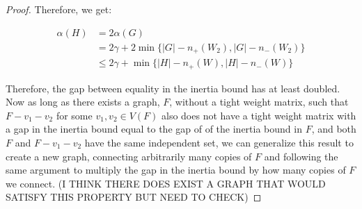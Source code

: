 \documentclass[12pt]{article}
\theoremstyle{parenbold}
\begin{document}
\begin{proof}
Therefore, we get:

\begin{equation}
\begin{split}
\alpha(H) & = 2\alpha(G) \\ & = 2\gamma + 2\min\{|G|-n_+(W_2), |G|-n_-(W_2)\} \\ & \leq 2\gamma + \min\{|H|-n_+(W), |H|-n_-(W)\}
\end{split}
\end{equation}

Therefore, the gap between equality in the inertia bound has at least doubled. Now as long as there exists a graph, $F$, without a tight weight matrix, such that $F-v_1-v_2$ for some $v_1, v_2 \in V(F)$ also does not have a tight weight matrix with a gap in the inertia bound equal to the gap of of the inertia bound in $F$, and both $F$ and $F-v_1-v_2$ have the same independent set, we can generalize this result to create a new graph, connecting arbitrarily many copies of $F$ and following the same argument to multiply the gap in the inertia bound by how many copies of $F$ we connect. (I THINK THERE DOES EXIST A GRAPH THAT WOULD SATISFY THIS PROPERTY BUT NEED TO CHECK)

\end{proof}



\end{document}
